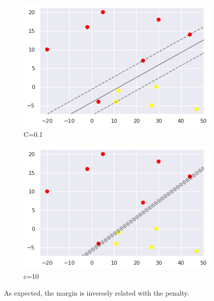 \documentclass[12pt]{article}
\begin{document}
\section{}
\begin{figure}[H]
	\centering
	\includegraphics{images/c=1e-1.png}
	\caption{C=0.1}
	\label{fig:4:c=0.1}
\end{figure}
\begin{figure}[H]
	\centering
	\includegraphics{images/c=10.png}
	\caption{c=10}
	\label{fig:4:c=10}
\end{figure}
As expected, the margin is inversely related with the penalty.
\newpage
\end{document}
